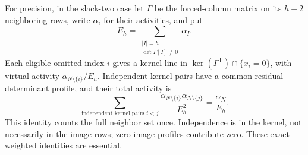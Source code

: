 \documentclass[11pt,a4paper]{article}
\theoremstyle{remark}\newtheorem{remark}[theorem]{Remark}
\begin{document}
For precision, in the slack-two case let $\Gamma$ be the forced-column matrix on its $h+2$ neighboring rows, write $\alpha_i$ for their activities, and put
\[
 E_h=\sum_{\substack{|I|=h\\\det\Gamma[I]\ne0}}\alpha_I.
\]
Each eligible omitted index $i$ gives a kernel line in
$\ker(\Gamma^{\mathsf T})\cap\{x_i=0\}$, with virtual activity
$\alpha_{N\setminus\{i\}}/E_h$. Independent kernel pairs have a common residual determinant profile, and their total activity is
\begin{equation}\label{mrn:s:rs:eq:kernelweights}
 \sum_{\text{independent kernel pairs }i<j}
 \frac{\alpha_{N\setminus\{i\}}\alpha_{N\setminus\{j\}}}{E_h^2}
 =\frac{\alpha_N}{E_h}.
\end{equation}
This identity counts the full neighbor set once. Independence is in the kernel, not necessarily in the image rows; zero image profiles contribute zero. These exact weighted identities are essential.
\end{document}
